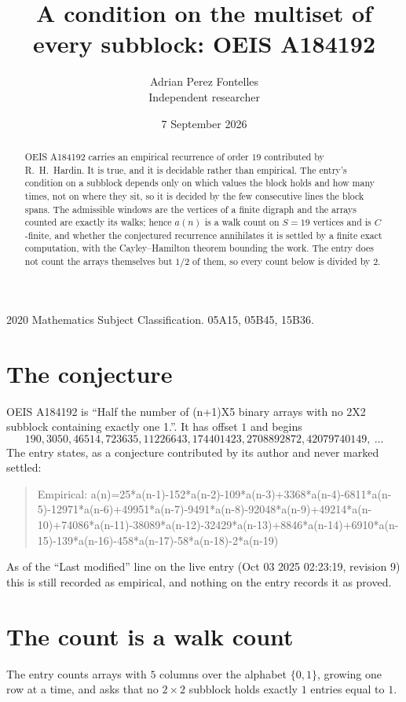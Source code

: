 \documentclass[11pt,a4paper]{article}
\title{A condition on the multiset of every subblock: OEIS A184192}
\author{Adrian Perez Fontelles\\ \small Independent researcher}
\date{7 September 2026}
\theoremstyle{plain}
\theoremstyle{definition}
\begin{document}
\maketitle

\begin{abstract}
OEIS A184192 carries an empirical recurrence of order $19$ contributed by R.~H.~Hardin. It is
true, and it is decidable rather than empirical. The entry's condition on a subblock depends
only on which values the block holds and how many times, not on where they sit, so it is
decided by the few consecutive lines the block spans. The admissible windows are the vertices
of a finite digraph and the arrays counted are exactly its walks; hence $a(n)$ is a walk count
on $S=19$ vertices and is $C$-finite, and whether the conjectured recurrence annihilates it
is settled by a finite exact computation, with the Cayley--Hamilton theorem bounding the
work. The entry does not count the arrays themselves but $1/2$ of them, so every count below is divided by $2$.
\end{abstract}

\noindent\small 2020 Mathematics Subject Classification. 05A15, 05B45, 15B36.\normalsize

\section{The conjecture}

OEIS A184192 is ``Half the number of (n+1)X5 binary arrays with no 2X2 subblock containing exactly one 1.''. It has offset $1$ and begins
\[
190, 3050, 46514, 723635, 11226643, 174401423, 2708892872, 42079740149,\ \dots
\]
The entry states, as a conjecture contributed by its author and never marked settled:
\begin{quote}
Empirical: a(n)=25*a(n-1)-152*a(n-2)-109*a(n-3)+3368*a(n-4)-6811*a(n-5)-12971*a(n-6)+49951*a(n-7)-9491*a(n-8)-92048*a(n-9)+49214*a(n-10)+74086*a(n-11)-38089*a(n-12)-32429*a(n-13)+8846*a(n-14)+6910*a(n-15)-139*a(n-16)-458*a(n-17)-58*a(n-18)-2*a(n-19)
\end{quote}
As of the ``Last modified'' line on the live entry (Oct 03 2025 02:23:19, revision 9) this is still
recorded as empirical, and nothing on the entry records it as proved.

\section{The count is a walk count}

The entry counts arrays with $5$ columns over the alphabet $\{0,1\}$, growing one row at a time, and asks that no $2\times2$ subblock holds exactly $1$ entries equal to $1$.
\end{document}
